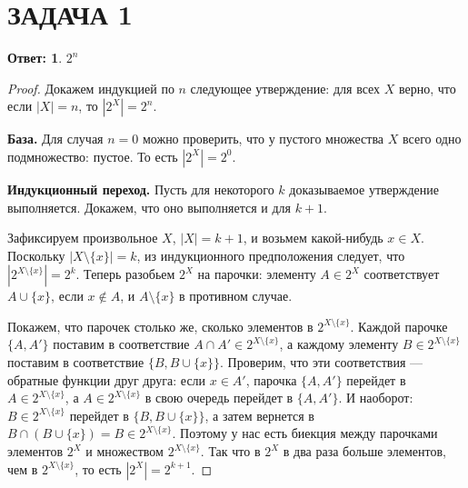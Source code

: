 \documentclass[a4paper]{article}
\theoremstyle{dotless}
\newtheorem*{answer}{Ответ:}
\begin{document}
\section*{ЗАДАЧА 1}


\begin{answer}
$2^n$
\end{answer}
\begin{proof}
Докажем индукцией по $n$ следующее утверждение: для всех $X$ верно, что если $|X|=n$, то $|2^X|=2^n$.

{\bf База.} Для случая $n=0$ можно проверить, что у пустого множества $X$ всего одно подмножество: пустое. То есть $|2^X|=2^0$.

{\bf Индукционный переход.} Пусть для некоторого $k$ доказываемое утверждение выполняется. Докажем, что оно выполняется и для $k+1$.

Зафиксируем произвольное $X$, $|X|=k+1$, и возьмем какой-нибудь $x\in X$. Поскольку $|X\setminus \{x\}| = k$, из индукционного предположения следует, что $|2^{X\setminus \{x\}}|=2^k$. Теперь разобьем $2^X$ на парочки: элементу $A\in 2^X$ соответствует $A\cup \{x\}$, если $x\not\in A$, и $A\setminus \{x\}$ в противном случае. 

Покажем, что парочек столько же, сколько элементов в $2^{X\setminus \{x\}}$. Каждой парочке $\{A, A'\}$ поставим в соответствие $A\cap A'\in 2^{X\setminus \{x\}}$, а каждому элементу $B \in 2^{X\setminus \{x\}}$ поставим в соответствие $\{B, B\cup \{x\}\}$. Проверим, что эти соответствия --- обратные функции друг друга:  если $x\in A'$, парочка $\{A, A'\}$ перейдет в $A\in 2^{X\setminus \{x\}}$, а $A\in 2^{X\setminus \{x\}}$ в свою очередь перейдет в $\{A, A'\}$. И наоборот: $B \in 2^{X\setminus \{x\}}$ перейдет в $\{B, B\cup\{x\}\}$, а затем вернется в $B\cap (B\cup\{x\})=B\in 2^{X\setminus \{x\}}$. Поэтому у нас есть биекция между парочками элементов $2^X$ и множеством $2^{X\setminus \{x\}}$. Так что в $2^X$ в два раза больше элементов, чем в $2^{X\setminus \{x\}}$, то есть $|2^X|=2^{k+1}$.
\end{proof}
\end{document}
